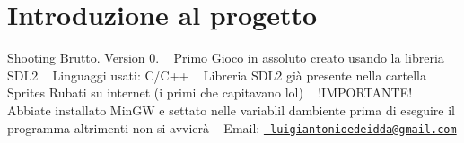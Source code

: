 \chapter{Introduzione al progetto}
\hypertarget{index}{}\label{index}
Shooting Brutto. Version 0. ~\newline
 Primo Gioco in assoluto creato usando la libreria SDL2 ~\newline
 Linguaggi usati\+: C/\+C++ ~\newline
 Libreria SDL2 già presente nella cartella ~\newline
 Sprites Rubati su internet (i primi che capitavano lol) ~\newline
 !\+IMPORTANTE! ~\newline
 Abbiate installato Min\+GW e settato nelle variablil d\textquotesingle{}ambiente prima di eseguire il programma altrimenti non si avvierà ~\newline
 Email\+: \href{mailto:luigiantonioedeidda@gmail.com}{\texttt{ luigiantonioedeidda@gmail.\+com}} 